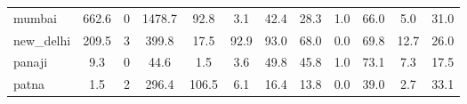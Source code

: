 {\begin{tabular}{l*{1}{ccccccccccc}}
mumbai      &       662.6&           0&      1478.7&        92.8&         3.1&        42.4&        28.3&         1.0&        66.0&         5.0&        31.0\\
new\_delhi   &       209.5&           3&       399.8&        17.5&        92.9&        93.0&        68.0&         0.0&        69.8&        12.7&        26.0\\
panaji      &         9.3&           0&        44.6&         1.5&         3.6&        49.8&        45.8&         1.0&        73.1&         7.3&        17.5\\
patna       &         1.5&           2&       296.4&       106.5&         6.1&        16.4&        13.8&         0.0&        39.0&         2.7&        33.1\\
\hline\hline
\end{tabular}
}

